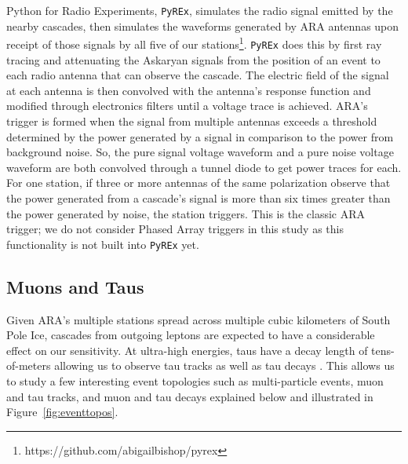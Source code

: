   Python for Radio Experiments, \texttt{PyREx}, simulates the radio signal emitted by the nearby cascades, then simulates the waveforms generated by ARA antennas upon receipt of those signals by all five of our stations\footnote{https://github.com/abigailbishop/pyrex}.
  \texttt{PyREx} does this by first ray tracing and attenuating the Askaryan signals from the position of an event to each radio antenna that can observe the cascade.
  The electric field of the signal at each antenna is then convolved with the antenna's response function and modified through electronics filters until a voltage trace is achieved.
  ARA's trigger is formed when the signal from multiple antennas exceeds a threshold determined by the power generated by a signal in comparison to the power from background noise.
  So, the pure signal voltage waveform and a pure noise voltage waveform are both convolved through a tunnel diode to get power traces for each.
  For one station, if three or more antennas of the same polarization observe that the power generated from a cascade's signal is more than six times greater than the power generated by noise, the station triggers.
  This is the classic ARA trigger; we do not consider Phased Array triggers in this study as this functionality is not built into \texttt{PyREx} yet.

  \subsection{Muons and Taus}

    Given ARA's multiple stations spread across multiple cubic kilometers of South Pole Ice, cascades from outgoing leptons are expected to have a considerable effect on our sensitivity.
    At ultra-high energies, taus have a decay length of tens-of-meters allowing us to observe tau tracks as well as tau decays \citep{nuradiomc2}.
    This allows us to study a few interesting event topologies such as multi-particle events, muon and tau tracks, and muon and tau decays explained below and illustrated in Figure~\ref{fig:eventtopos}.
    
